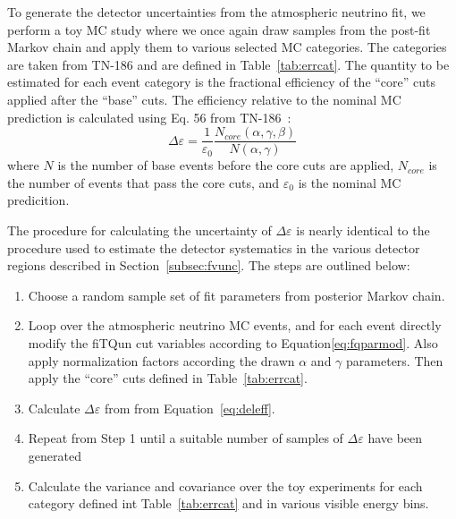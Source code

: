 To generate the detector uncertainties from the atmospheric neutrino fit, we
perform a toy MC study where we once again draw samples from the post-fit Markov
chain and apply them to various selected MC categories.  The categories are
taken from TN-186 and are defined in Table~\ref{tab:errcat}. The quantity to
be estimated for each event category is the fractional efficiency of the ``core''
cuts applied after the ``base'' cuts.  The efficiency relative to the nominal MC
prediction is calculated using Eq. 56 from TN-186~\cite{tn186}:
\begin{equation}
  \Delta \varepsilon = \frac{1}{\varepsilon_{0}}\frac{N_{core}(\alpha,\gamma,\beta)}{N(\alpha, \gamma)} 
  \label{eq:deleff}
\end{equation}
where $N$ is the number of base events before the core cuts are applied,
$N_{core}$ is the number of events that pass the core cuts,  and
$\varepsilon_{0}$ is the nominal MC predicition.

%
%

The procedure for calculating the uncertainty of $\Delta \varepsilon$ is nearly
identical to the procedure used to estimate the detector systematics in the various
detector regions described in Section~\ref{subsec:fvunc}.  The steps are outlined
below:

\begin{enumerate}
  \item Choose a random sample set of fit parameters from posterior Markov chain.
  \item Loop over the atmospheric neutrino MC events, and for each event directly modify the fiTQun cut variables
    according to Equation\ref{eq:fqparmod}. Also apply normalization factors according the drawn $\alpha$ and
    $\gamma$ parameters.  Then apply the ``core'' cuts defined in Table~\ref{tab:errcat}.
  \item Calculate $\Delta \varepsilon$ from from Equation~\ref{eq:deleff}.
  \item Repeat from Step 1 until a suitable number of samples of $\Delta \varepsilon$ have been generated
  \item Calculate the variance and covariance over the toy experiments for each category defined
    int Table~\ref{tab:errcat} and in various visible energy bins.
\end{enumerate}

